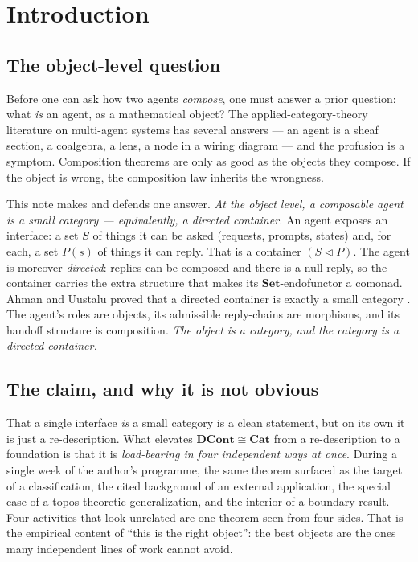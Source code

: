 \documentclass[11pt]{amsart}
\theoremstyle{plain}
\theoremstyle{definition}
\newcommand{\Set}{\mathbf{Set}}
\newcommand{\Cat}{\mathbf{Cat}}
\newcommand{\DCont}{\mathbf{DCont}}
\newcommand{\seq}{\vartriangleleft}
\newcommand{\iso}{\cong}
\begin{document}
\section{Introduction}\label{sec:intro}

\subsection*{The object-level question}
Before one can ask how two agents \emph{compose}, one must answer a prior question: what
\emph{is} an agent, as a mathematical object? The applied-category-theory literature on
multi-agent systems has several answers --- an agent is a sheaf section, a coalgebra, a lens, a
node in a wiring diagram --- and the profusion is a symptom. Composition theorems are only as
good as the objects they compose. If the object is wrong, the composition law inherits the
wrongness.

This note makes and defends one answer. \emph{At the object level, a composable agent is a small
category --- equivalently, a directed container.} An agent exposes an interface: a set $S$ of
things it can be asked (requests, prompts, states) and, for each, a set $P(s)$ of things it can
reply. That is a container $(S \seq P)$. The agent is moreover \emph{directed}: replies can be
composed and there is a null reply, so the container carries the extra structure that makes its
$\Set$-endofunctor a comonad. Ahman and Uustalu proved that a directed container is exactly a
small category \cite{AhmanUustalu}. The agent's roles are objects, its admissible reply-chains
are morphisms, and its handoff structure is composition. \emph{The object is a category, and the
category is a directed container.}

\subsection*{The claim, and why it is not obvious}
That a single interface \emph{is} a small category is a clean statement, but on its own it is
just a re-description. What elevates $\DCont\iso\Cat$ from a re-description to a foundation is
that it is \emph{load-bearing in four independent ways at once}. During a single week of the
author's programme, the same theorem surfaced as the target of a classification, the cited
background of an external application, the special case of a topos-theoretic generalization, and
the interior of a boundary result. Four activities that look unrelated are one theorem seen from
four sides. That is the empirical content of ``this is the right object'': the best objects are
the ones many independent lines of work cannot avoid.
\end{document}
